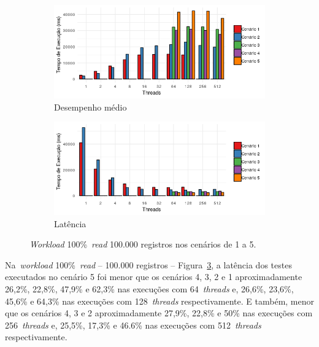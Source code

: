 \documentclass[12pt]{article}
\begin{document}
\begin{figure}
    \centering
    \begin{subfigure}[b]{0.49\textwidth}   
        \centering 
        \includegraphics[width=\textwidth]{images/figura13}
        \caption{Desempenho médio}
        \label{figura13}
    \end{subfigure}
    \begin{subfigure}[b]{0.49\textwidth}   
        \centering 
        \includegraphics[width=\textwidth]{images/figura14}
        \caption{Latência}
        \label{figura14}
    \end{subfigure}
    \caption{\emph{Workload} 100\%~\emph{read} 100.000 registros nos cenários de 1 a 5.}
\end{figure}

Na~\emph{workload} 100\%~\emph{read} -- 100.000 registros -- Figura~\ref{figura14}, a latência dos testes executados no cenário 5 foi menor que os cenários 4, 3, 2 e 1 aproximadamente 26,2\%, 22,8\%, 47,9\% e 62,3\% nas execuções com 64~\emph{threads} e, 26,6\%, 23,6\%, 45,6\% e 64,3\% nas execuções com 128~\emph{threads} respectivamente. E também, menor que os cenários 4, 3 e 2 aproximadamente 27,9\%, 22,8\% e 50\% nas execuções com 256~\emph{threads} e, 25,5\%, 17,3\% e 46.6\% nas execuções com 512~\emph{threads} respectivamente.
\end{document}
